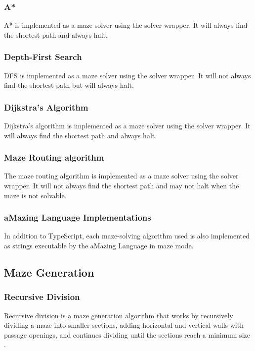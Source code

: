 \subsubsection{A*}

A* \cite{a-star-alg} is implemented as a maze solver using the solver wrapper. It will always find the shortest path and always halt.

\subsubsection{Depth-First Search}

DFS \cite{pkd} is implemented as a maze solver using the solver wrapper. It will not always find the shortest path but will always halt.

\subsubsection{Dijkstra's Algorithm}

Dijkstra's algorithm \cite{dijkstras-alg} is implemented as a maze solver using the solver wrapper. It will always find the shortest path and always halt.

\subsubsection{Maze Routing algorithm}

The maze routing algorithm \cite{maze-routing-alg} is implemented as a maze solver using the solver wrapper. It will not always find the shortest path and may not halt when the maze is not solvable.

\subsubsection{aMazing Language Implementations}

In addition to TypeScript, each maze-solving algorithm used is also implemented as strings executable by the aMazing Language in maze mode.

\subsection{Maze Generation}
\subsubsection{Recursive Division}
Recursive division is a maze generation algorithm that works by recursively dividing a maze into smaller sections, adding horizontal and vertical walls with passage openings, and continues dividing until the sections reach a minimum size \cite{recursive-division-alg}.

